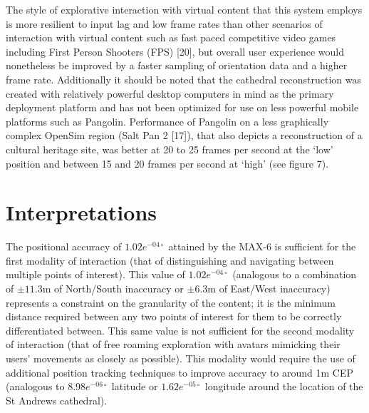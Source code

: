 The style of explorative interaction with virtual content that this system employs is more resilient to input lag and low frame rates than other scenarios of interaction with virtual content such as fast paced competitive video games including First Person Shooters (FPS) [20], but overall user experience would nonetheless be improved by a faster sampling of orientation data and a higher frame rate. Additionally it should be noted that the cathedral reconstruction was created with relatively powerful desktop computers in mind as the primary deployment platform and has not been optimized for use on less powerful mobile platforms such as Pangolin. Performance of Pangolin on a less graphically complex OpenSim region (Salt Pan 2 [17]), that also depicts a reconstruction of a cultural heritage site, was better at 20 to 25 frames per second at the `low' position and between 15 and 20 frames per second at `high' (see figure 7).


\section{Interpretations}
The positional accuracy of $1.02e^{-04\circ}$ attained by the MAX-6 is sufficient for the first modality of interaction (that of distinguishing and navigating between multiple points of interest). This value of $1.02e^{-04\circ}$ (analogous to a combination of $\pm11.3$m of North/South inaccuracy or $\pm6.3$m of East/West inaccuracy) represents a constraint on the granularity of the content; it is the minimum distance required between any two points of interest for them to be correctly differentiated between. This same value is not sufficient for the second modality of interaction (that of free roaming exploration with avatars mimicking their users' movements as closely as possible). This modality would require the use of additional position tracking techniques to improve accuracy to around 1m CEP (analogous to $8.98e^{-06\circ}$ latitude or $1.62e^{-05\circ}$ longitude around the location of the St Andrews cathedral).

